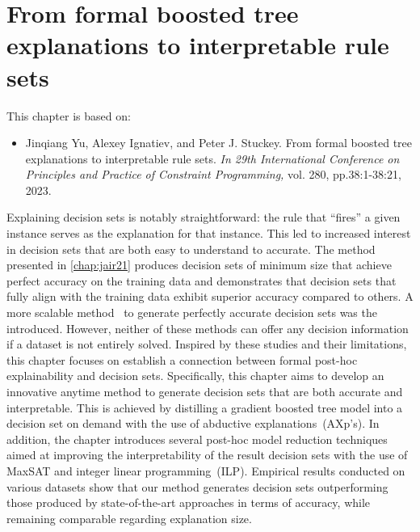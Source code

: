 \chapter{From formal boosted tree explanations to
interpretable rule sets} \label{chap:cp23}

This chapter is based on:
\begin{itemize}
	\item Jinqiang Yu, Alexey Ignatiev, and Peter J. Stuckey. From formal boosted tree explanations to
interpretable rule sets. \emph{In 29th International Conference on Principles and Practice of
	Constraint Programming,} vol. 280, pp.38:1-38:21, 2023.
\end{itemize}

Explaining decision sets is notably straightforward: the rule that ``fires'' a given instance
serves as the explanation for that instance.
%
This led to increased interest in decision sets that are both easy to understand
to accurate.
%
The method presented in \autoref{chap:jair21} produces decision sets of minimum size that achieve
perfect accuracy on the training data and demonstrates that decision sets that fully align with the
training data exhibit superior accuracy compared to others.
%
A more scalable method~\cite{ilsms-aaai21} to generate perfectly accurate decision sets was the
introduced.
%
However, neither of these methods can offer any decision information if a dataset is not entirely solved.
%
Inspired by these studies and their limitations, this chapter focuses on establish a connection between 
formal post-hoc explainability and decision sets.
%
Specifically, this chapter aims to develop an innovative anytime method to generate decision sets that are 
both accurate and interpretable. 
%
This is achieved by distilling a gradient boosted tree model into a decision set on demand with 
the use of abductive explanations~(AXp's).
%
In addition, the chapter introduces several post-hoc model reduction techniques aimed at
improving the interpretability of the result decision sets with the use of MaxSAT and 
integer linear programming~(ILP).
%
Empirical results conducted on various datasets show that our method 
generates decision sets outperforming those produced by state-of-the-art approaches in terms of
accuracy, while remaining comparable regarding explanation size.



